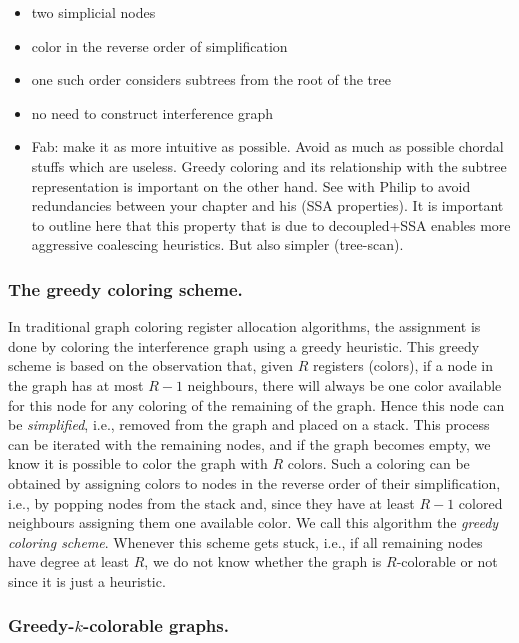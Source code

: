 {{\sl
\begin{itemize}
  \item two simplicial nodes
  \item color in the reverse order of simplification
  \item one such order considers subtrees from the root of the tree
  \item no need to construct interference graph
  \item Fab: make it as more intuitive as possible. Avoid as much as possible 
    chordal stuffs which are useless. Greedy coloring and its relationship with 
    the subtree representation is important on the other hand. See with Philip 
    to avoid redundancies between your chapter and his (SSA properties). It is 
    important to outline here that this property that is due to decoupled+SSA 
    enables more aggressive coalescing heuristics. But also simpler 
    (tree-scan).
\end{itemize}
}

\subsubsection{The greedy coloring scheme.}

In traditional graph coloring register allocation algorithms, the assignment is 
done by coloring the interference graph using a greedy heuristic. This greedy 
scheme is based on the observation that, given $R$ registers (colors), if a 
node in the graph has at most $R-1$ neighbours, there will always be one color 
available for this node for any coloring of the remaining of the graph. Hence 
this node can be \emph{simplified}, i.e., removed from the graph and placed on 
a stack. This process can be iterated with the remaining nodes, and if the 
graph becomes empty, we know it is possible to color the graph with $R$ colors. 
Such a coloring can be obtained by assigning colors to nodes in the reverse 
order of their simplification, i.e., by popping nodes from the stack and, since 
they have at least $R-1$ colored neighbours assigning them one available color. 
We call this algorithm the \emph{greedy coloring scheme}. Whenever this scheme 
gets stuck, i.e., if all remaining nodes have degree at least $R$, we do not 
know whether the graph is $R$-colorable or not since it is just a heuristic.


\subsubsection{Greedy-$k$-colorable graphs.}

}
